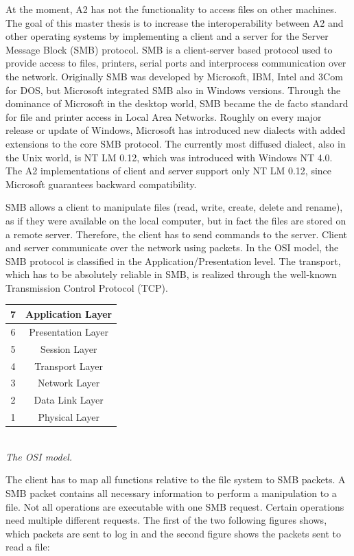 \documentclass[11pt,a4paper]{book}
\begin{document}
At the moment, A2 has not the functionality to access files on other machines. The goal of this master thesis is to increase the interoperability between A2 and other operating systems by implementing a client and a server for the Server Message Block (SMB) protocol. SMB is a client-server based protocol used to provide access to files, printers, serial ports and interprocess communication over the network. Originally SMB was developed by Microsoft, IBM, Intel and 3Com for DOS, but Microsoft integrated SMB also in Windows versions. Through the dominance of Microsoft in the desktop world, SMB became the de facto standard for file and printer access in Local Area Networks. Roughly on every major release or update of Windows, Microsoft has introduced new dialects with added extensions to the core SMB protocol. The currently most diffused dialect, also in the Unix world, is NT LM 0.12, which was introduced with Windows NT 4.0. The A2 implementations of client and server support only NT LM 0.12, since Microsoft guarantees backward compatibility.

SMB allows a client to manipulate files (read, write, create, delete and rename), as if they were available on the local computer, but in fact the files are stored on a remote server. Therefore, the client has to send commands to the server. Client and server communicate over the network using packets. In the OSI model, the SMB protocol is classified in the Application/Presentation level. The transport, which has to be absolutely reliable in SMB, is realized through the well-known Transmission Control Protocol (TCP).

\begin{center}
\begin{tabular}{|c|c|}
\hline
7 & Application Layer \\
\hline
6 & Presentation Layer \\
\hline
5 & Session Layer \\
\hline
4 & Transport Layer \\
\hline
3 & Network Layer \\
\hline
2 & Data Link Layer \\
\hline
1 & Physical Layer \\
\hline
\end{tabular} \\
\vspace{6pt}
\textit{The OSI model.}
\end{center}

The client has to map all functions relative to the file system to SMB packets. A SMB packet contains all necessary information to perform a manipulation to a file. Not all operations are executable with one SMB request. Certain operations need multiple different requests. The first of the two following figures shows, which packets are sent to log in and the second figure shows the packets sent to read a file:
\end{document}
